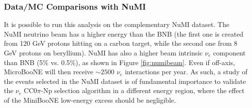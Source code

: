 \subsubsection{Data/MC Comparisons with NuMI}
It is possible to run this analysis on the complementary NuMI dataset. The NuMI neutrino beam has a higher energy than the BNB (the first one is created from 120 GeV protons hitting on a carbon target, while the second one from 8 GeV protons on beryllium). NuMI has also a higher beam intrinsic $\nu_{e}$ component than BNB (5\% vs. 0.5\%), as shown in Figure \ref{fig:numibeam}. Even if off-axis, MicroBooNE will then receive $\sim2500$ $\nu_{e}$ interactions per year. 
As such, a study of the events selected in the NuMI dataset is of fundamental importance to validate the $\nu_{e}$ CC0$\pi$-Np selection algorithm in a different energy region, where the effect of the MiniBooNE low-energy excess should be negligible.

